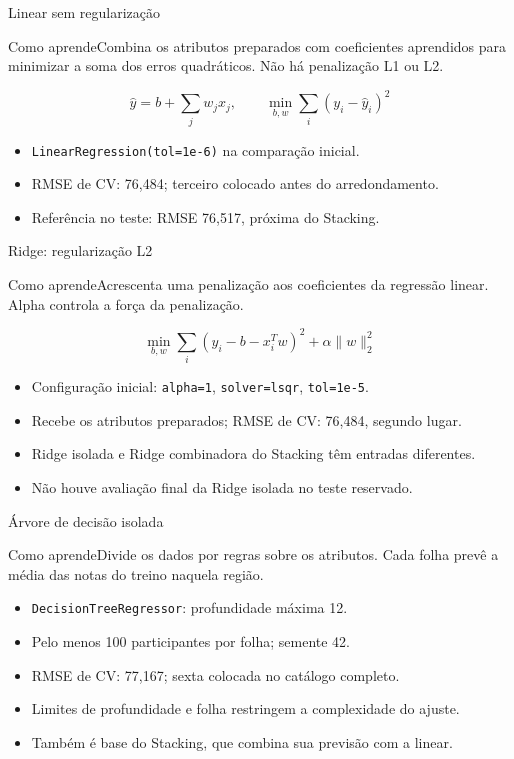 \begin{frame}{Linear sem regularização}
\begin{block}{Como aprende}Combina os atributos preparados com coeficientes aprendidos para minimizar a soma dos erros quadráticos. Não há penalização L1 ou L2.\end{block}
\[
\widehat y=b+\sum_j w_jx_j,\qquad \min_{b,w}\sum_i(y_i-\widehat y_i)^2
\]
\begin{itemize}
\item \texttt{LinearRegression(tol=1e-6)} na comparação inicial.
\item RMSE de CV: 76,484; terceiro colocado antes do arredondamento.
\item Referência no teste: RMSE 76,517, próxima do Stacking.
\end{itemize}
\end{frame}
\begin{frame}{Ridge: regularização L2}
\begin{block}{Como aprende}Acrescenta uma penalização aos coeficientes da regressão linear. Alpha controla a força da penalização.\end{block}
\[
\min_{b,w}\sum_i(y_i-b-x_i^Tw)^2+\alpha\lVert w\rVert_2^2
\]
\begin{itemize}
\item Configuração inicial: \texttt{alpha=1}, \texttt{solver=lsqr}, \texttt{tol=1e-5}.
\item Recebe os atributos preparados; RMSE de CV: 76,484, segundo lugar.
\item Ridge isolada e Ridge combinadora do Stacking têm entradas diferentes.
\item Não houve avaliação final da Ridge isolada no teste reservado.
\end{itemize}
\end{frame}
\begin{frame}{Árvore de decisão isolada}
\begin{block}{Como aprende}Divide os dados por regras sobre os atributos. Cada folha prevê a média das notas do treino naquela região.\end{block}
\begin{itemize}
\item \texttt{DecisionTreeRegressor}: profundidade máxima 12.
\item Pelo menos 100 participantes por folha; semente 42.
\item RMSE de CV: 77,167; sexta colocada no catálogo completo.
\item Limites de profundidade e folha restringem a complexidade do ajuste.
\item Também é base do Stacking, que combina sua previsão com a linear.
\end{itemize}
\end{frame}
